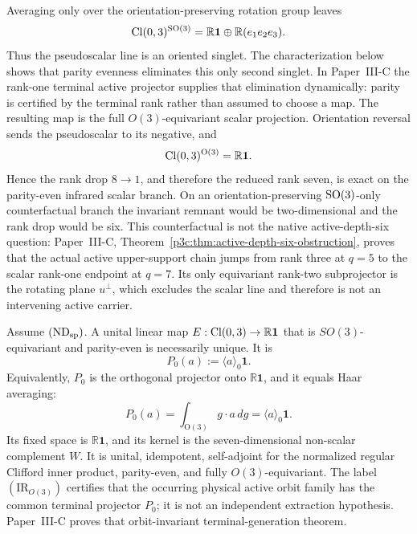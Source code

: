\documentclass[12pt,a4paper]{article}
\begin{document}
\begin{remark}
\label{p3:rem:o3-not-so3}
Averaging only over the orientation-preserving rotation group leaves
\[
 \operatorname{Cl}(0,3)^{\mathrm{SO}(3)}
 =\mathbb R\mathbf1\oplus\mathbb R(e_1e_2e_3).
\]
Thus the pseudoscalar line is an oriented singlet.  The characterization
below shows that parity evenness eliminates this only second singlet.  In
Paper~III-C the rank-one terminal active projector supplies that elimination
dynamically: parity is certified by the terminal rank rather than assumed to
choose a map.  The resulting map is the full \(O(3)\)-equivariant scalar
projection.  Orientation reversal sends the pseudoscalar to its negative, and
\[
 \operatorname{Cl}(0,3)^{\mathrm O(3)}=\mathbb R\mathbf1.
\]
Hence the rank drop \(8\to1\), and therefore the reduced rank seven, is exact
on the parity-even infrared scalar branch.  On an orientation-preserving
\(\mathrm{SO}(3)\)-only counterfactual branch the invariant remnant would be
two-dimensional and the rank drop would be six.  This counterfactual is not
the native active-depth-six question: Paper~III-C,
Theorem~\ref{p3c:thm:active-depth-six-obstruction}, proves that the actual
active upper-support chain jumps from rank three at \(q=5\) to the scalar
rank-one endpoint at \(q=7\).  Its only equivariant rank-two subprojector is
the rotating plane \(u^\perp\), which excludes the scalar line and therefore
is not an intervening active carrier.
\end{remark}

\begin{proposition}
\label{p3:prop:reeb-selection}
Assume \((\mathrm{ND}_{\rm sp})\).  A unital linear map
\(E:\operatorname{Cl}(0,3)\to\mathbb R\mathbf1\) that is \(SO(3)\)-equivariant and
parity-even is necessarily unique.  It is
\[
 P_0(a):=\langle a\rangle_0\mathbf1.
\]
Equivalently, \(P_0\) is the orthogonal projector onto
\(\mathbb R\mathbf1\), and it equals Haar averaging:
\begin{equation}
\label{p3:eq:IR-clifford-expectation}
 P_0(a)
 =\int_{\mathrm O(3)}g\cdot a\,dg
 =\langle a\rangle_0\mathbf1.
\end{equation}
Its fixed space is \(\mathbb R\mathbf1\), and its kernel is the
seven-dimensional non-scalar complement \(W\).  It is unital, idempotent,
self-adjoint for the normalized regular Clifford inner product, parity-even,
and fully \(O(3)\)-equivariant.  The label
\((\mathrm{IR}_{O(3)})\) certifies that the occurring physical
active orbit family has the common terminal projector \(P_0\); it is not an
independent extraction hypothesis.  Paper~III-C proves that orbit-invariant
terminal-generation theorem.
\end{proposition}
\end{document}
